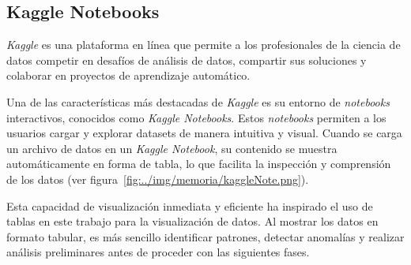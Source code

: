 \subsection{Kaggle Notebooks}
\textit{Kaggle} es una plataforma en línea que permite a los profesionales de la ciencia de datos competir en desafíos de análisis de datos, compartir sus soluciones y colaborar en proyectos de aprendizaje automático.

Una de las características más destacadas de \textit{Kaggle} es su entorno de \textit{notebooks} interactivos, conocidos como \textit{Kaggle Notebooks}. Estos \textit{notebooks} permiten a los usuarios cargar y explorar datasets de manera intuitiva y visual. Cuando se carga un archivo de datos en un \textit{Kaggle Notebook}, su contenido se muestra automáticamente en forma de tabla, lo que facilita la inspección y comprensión de los datos (ver figura~\ref{fig:../img/memoria/kaggleNote.png}).


Esta capacidad de visualización inmediata y eficiente ha inspirado el uso de tablas en este trabajo para la visualización de datos. Al mostrar los datos en formato tabular, es más sencillo identificar patrones, detectar anomalías y realizar análisis preliminares antes de proceder con las siguientes fases. 